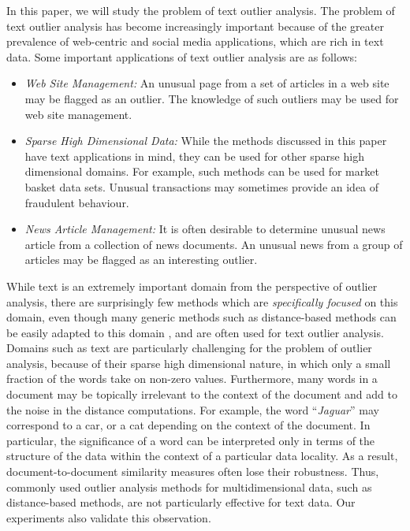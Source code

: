 In this paper, we will study the problem of text outlier analysis.
The problem of text outlier analysis has become increasingly
important because of the greater prevalence of web-centric and
social media applications, which are rich in text data. Some
important applications of text outlier analysis are as follows:
\begin{itemize}
\item {\em Web Site Management:} An unusual page from a set of
articles in a web site may be flagged as an outlier. The knowledge
of such outliers may be used for web site management.
\item  {\em Sparse High Dimensional Data:} While the methods
discussed in this paper have text applications in mind, they can be
used for other sparse high dimensional domains. For example, such
methods can be used for market basket data sets. Unusual
transactions  may sometimes provide an idea of fraudulent behaviour.
\item {\em News Article Management:}   It is often desirable to
determine unusual news article from a collection of news documents. An
unusual news from a group of articles may be flagged as an
interesting outlier.
\end{itemize}
While text is an extremely important domain from the perspective of
outlier analysis, there are surprisingly few methods which are {\em
specifically focused}  on this domain, even though many generic
methods such as distance-based methods can be easily adapted to this
domain \cite{knorr,rama}, and are often used for text outlier
analysis. Domains such as text are particularly challenging for the
 problem of outlier analysis, because of their sparse high
 dimensional nature, in which only a small fraction of the words
 take on non-zero values.  Furthermore, many  words in a document
 may  be  topically irrelevant to the context of the document and add to the noise in the
 distance computations. For example, the word ``{\em Jaguar}'' may correspond
 to a car, or a cat depending on the context of the document.
     In
 particular, the significance of a word can be interpreted only in
 terms of the structure of the data within the context of a
 particular data locality.  As a result, document-to-document similarity
 measures often lose their robustness. Thus, commonly used
 outlier analysis methods for multidimensional data, such as distance-based methods, are not
 particularly effective for text data. Our experiments also validate this observation. 

